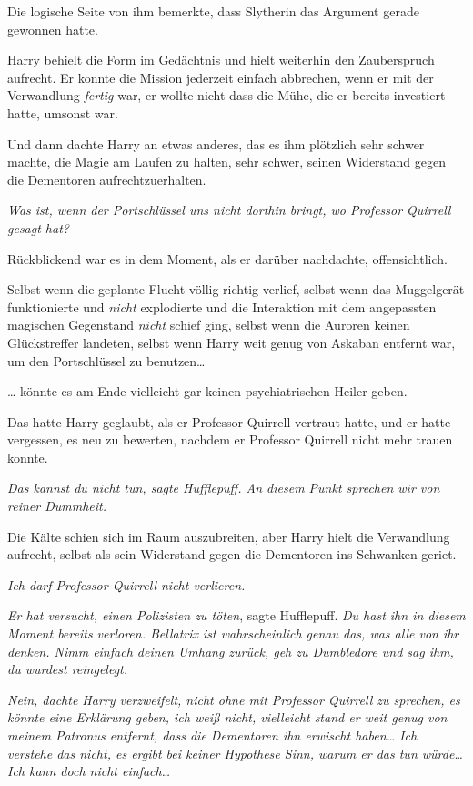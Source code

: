 {Die logische Seite von ihm bemerkte, dass Slytherin das Argument gerade gewonnen hatte.

Harry behielt die Form im Gedächtnis und hielt weiterhin den Zauberspruch aufrecht. Er konnte die Mission jederzeit einfach abbrechen, wenn er mit der Verwandlung \emph{fertig} war, er wollte nicht dass die Mühe, die er bereits investiert hatte, umsonst war.

Und dann dachte Harry an etwas anderes, das es ihm plötzlich sehr schwer machte, die Magie am Laufen zu halten, sehr schwer, seinen Widerstand gegen die Dementoren aufrechtzuerhalten.

\emph{\emph{Was ist, wenn der Portschlüssel uns nicht dorthin bringt, wo Professor Quirrell gesagt hat?}}

Rückblickend war es in dem Moment, als er darüber nachdachte, offensichtlich.

Selbst wenn die geplante Flucht völlig richtig verlief, selbst wenn das Muggelgerät funktionierte und \emph{nicht} explodierte und die Interaktion mit dem angepassten magischen Gegenstand \emph{nicht} schief ging, selbst wenn die Auroren keinen Glückstreffer landeten, selbst wenn Harry weit genug von Askaban entfernt war, um den Portschlüssel zu benutzen…

… könnte es am Ende vielleicht gar keinen psychiatrischen Heiler geben.

Das hatte Harry geglaubt, als er Professor Quirrell vertraut hatte, und er hatte vergessen, es neu zu bewerten, nachdem er Professor Quirrell nicht mehr trauen konnte.

\emph{\emph{Das} \emph{kannst du} \emph{nicht tun,} sagte Hufflepuff\emph{. An diesem Punkt sprechen wir von reiner Dummheit.}}

Die Kälte schien sich im Raum auszubreiten, aber Harry hielt die Verwandlung aufrecht, selbst als sein Widerstand gegen die Dementoren ins Schwanken geriet.

\emph{\emph{Ich darf Professor Quirrell nicht verlieren.}}

\emph{Er hat versucht, einen Polizisten zu töten}, sagte Hufflepuff. \emph{Du hast ihn in diesem Moment bereits verloren. Bellatrix ist wahrscheinlich genau das, was alle von ihr denken. Nimm einfach deinen Umhang zurück, geh zu Dumbledore und sag ihm, du wurdest reingelegt.}

\emph{\emph{Nein}, dachte Harry verzweifelt, \emph{nicht ohne mit Professor Quirrell zu sprechen, es könnte eine Erklärung geben, ich weiß nicht, vielleicht stand er weit genug von meinem Patronus entfernt, dass die Dementoren ihn erwischt haben… Ich verstehe das nicht, es ergibt bei} \emph{keiner} \emph{Hypothese} \emph{Sinn, warum er das tun würde… Ich kann doch nicht einfach…}}

}
